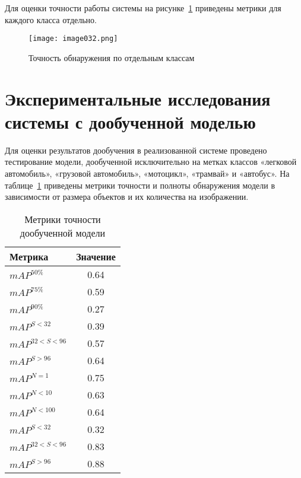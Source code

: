 Для оценки точности работы системы на рисунке~\ref{fig:image032} приведены метрики для каждого класса отдельно.

\begin{figure}[htbp]
\centering
\texttt{[image: image032.png]}
\caption{Точность обнаружения по отдельным классам}%
\label{fig:image032}
\end{figure}

\section{Экспериментальные исследования системы с дообученной моделью}

Для оценки результатов дообучения в реализованной системе проведено тестирование модели, дообученной исключительно на метках классов «легковой автомобиль», «грузовой автомобиль», «мотоцикл», «трамвай» и «автобус». На таблице~\ref{tabular:tab_exp_2} приведены метрики точности и полноты обнаружения модели в зависимости от размера объектов и их количества на изображении.

\begin{table}[H]
	\def\arraystretch{1.3}
	\caption{Метрики точности дообученной модели}
	\begin{center}
		\begin{tabular}{|l|c|}
			\hline
			Метрика & Значение\\  \hline			
			\(mAP^{50\%}\) & 0.64\\ \hline			
			\(mAP^{75\%}\) & 0.59\\ \hline
			\(mAP^{90\%}\) & 0.27\\ \hline
			\(mAP^{S<32}\) & 0.39\\ \hline
			\(mAP^{32<S<96}\) & 0.57\\ \hline
			\(mAP^{S>96}\) & 0.64\\ \hline
			\(mAP^{N=1}\) & 0.75\\ \hline
			\(mAP^{N<10}\) & 0.63\\ \hline
			\(mAP^{N<100}\) & 0.64\\ \hline
			\(mAP^{S<32}\) & 0.32\\ \hline
			\(mAP^{32<S<96}\) & 0.83\\ \hline
			\(mAP^{S>96}\) & 0.88\\ \hline			
		\end{tabular}
		\label{tabular:tab_exp_2}
	\end{center}
\end{table}

